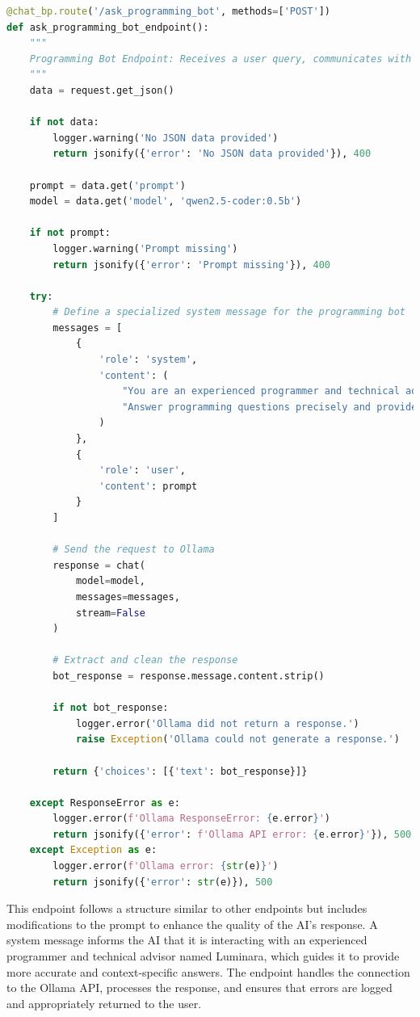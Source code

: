 \begin{lstlisting}[language=Python, caption={Programming Bot Endpoint}]
@chat_bp.route('/ask_programming_bot', methods=['POST'])
def ask_programming_bot_endpoint():
    """
    Programming Bot Endpoint: Receives a user query, communicates with Ollama, and returns the response.
    """
    data = request.get_json()

    if not data:
        logger.warning('No JSON data provided')
        return jsonify({'error': 'No JSON data provided'}), 400

    prompt = data.get('prompt')
    model = data.get('model', 'qwen2.5-coder:0.5b')

    if not prompt:
        logger.warning('Prompt missing')
        return jsonify({'error': 'Prompt missing'}), 400

    try:
        # Define a specialized system message for the programming bot
        messages = [
            {
                'role': 'system',
                'content': (
                    "You are an experienced programmer and technical advisor named Luminara. "
                    "Answer programming questions precisely and provide clear code examples in the requested programming language."
                )
            },
            {
                'role': 'user',
                'content': prompt
            }
        ]

        # Send the request to Ollama
        response = chat(
            model=model,
            messages=messages,
            stream=False
        )

        # Extract and clean the response
        bot_response = response.message.content.strip()

        if not bot_response:
            logger.error('Ollama did not return a response.')
            raise Exception('Ollama could not generate a response.')

        return {'choices': [{'text': bot_response}]}

    except ResponseError as e:
        logger.error(f'Ollama ResponseError: {e.error}')
        return jsonify({'error': f'Ollama API error: {e.error}'}), 500
    except Exception as e:
        logger.error(f'Ollama error: {str(e)}')
        return jsonify({'error': str(e)}), 500 
\end{lstlisting}

This endpoint follows a structure similar to other endpoints but includes modifications to the prompt to enhance the quality of the AI's response. A system message informs the AI that it is interacting with an experienced programmer and technical advisor named Luminara, which guides it to provide more accurate and context-specific answers. The endpoint handles the connection to the Ollama API, processes the response, and ensures that errors are logged and appropriately returned to the user.

